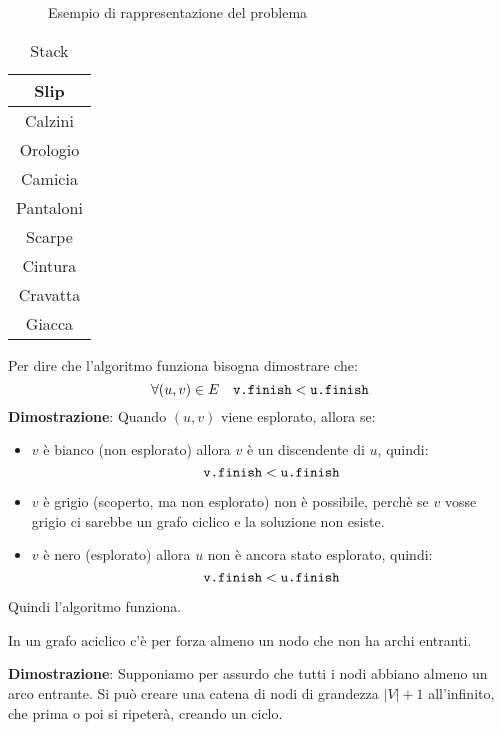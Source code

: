 \documentclass[a4paper]{article}
\begin{document}
\begin{example}
\begin{figure}[H]
    \caption{Esempio di rappresentazione del problema}
  \end{figure}
  \begin{table}[H]
    \centering
    \begin{tabular}{|c|}
      \hline
      Slip\\
      \hline
      Calzini\\
      \hline
      Orologio\\
      \hline
      Camicia\\
      \hline
      Pantaloni\\
      \hline
      Scarpe\\
      \hline
      Cintura\\
      \hline
      Cravatta\\
      \hline
      Giacca\\
      \hline
    \end{tabular}
    \caption{Stack}
  \end{table}
  \noindent
  Per dire che l'algoritmo funziona bisogna dimostrare che:
  \[
    \forall (u,v) \in E \quad \text{\texttt{v.finish}} < \text{\texttt{u.finish}}
  \] 
  \textbf{Dimostrazione}: Quando \( (u,v) \) viene esplorato, allora se:
  \begin{itemize}
    \item \( v \) è bianco (non esplorato) allora \( v \) è un discendente di \( u \),
      quindi:
      \[
        \text{\texttt{v.finish}} < \text{\texttt{u.finish}}
      \] 
    \item \( v \) è grigio (scoperto, ma non esplorato) non è possibile, perchè se \( v \) 
      vosse grigio ci sarebbe un grafo ciclico e la soluzione non esiste.
    \item \( v \) è nero (esplorato) allora \( u \) non è ancora stato esplorato, quindi: 
      \[
        \text{\texttt{v.finish}} < \text{\texttt{u.finish}}
      \] 
  \end{itemize}
  Quindi l'algoritmo funziona.
\end{example}

\begin{theorem}
  In un grafo aciclico c'è per forza almeno un nodo che non ha archi entranti.

  \vspace{1em}
  \noindent
  \textbf{Dimostrazione}: Supponiamo per assurdo che tutti i nodi abbiano almeno un arco
  entrante. Si può creare una catena di nodi di grandezza \( |V|+1 \) all'infinito, che
  prima o poi si ripeterà, creando un ciclo.
\end{theorem}
\end{document}
